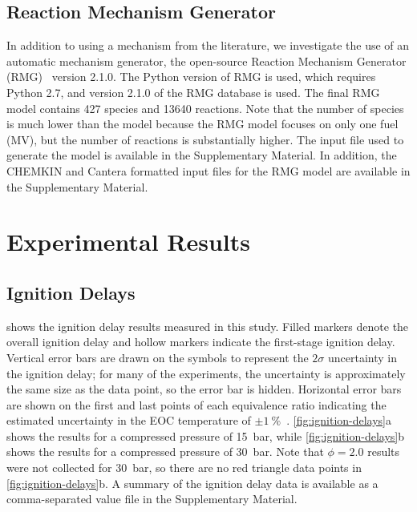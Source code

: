 \documentclass[letterpaper, review, sort&compress]{elsarticle}
\begin{document}
\subsection{Reaction Mechanism Generator}\label{sec:reaction-mechanism-generator}

In addition to using a mechanism from the literature, we investigate the use of an automatic
mechanism generator, the open-source Reaction Mechanism Generator (RMG)~\cite{Allen2012} version
2.1.0. The Python version of RMG is used, which requires Python 2.7, and version 2.1.0 of the RMG
database is used. The final RMG model contains 427 species and 13640 reactions. Note that the number
of species is much lower than the \citet{Dievart2013} model because the RMG model focuses on only
one fuel (MV), but the number of reactions is substantially higher. The input file used to generate
the model is available in the Supplementary Material. In addition, the CHEMKIN and Cantera formatted
input files for the RMG model are available in the Supplementary Material.

\section{Experimental Results}\label{sec:experimental-results}
\subsection{Ignition Delays}\label{sec:ignition-delays}

 shows the ignition delay results measured in this study. Filled markers
denote the overall ignition delay and hollow markers indicate the first-stage ignition delay.
Vertical error bars are drawn on the symbols to represent the \(2\sigma\) uncertainty in the
ignition delay; for many of the experiments, the uncertainty is approximately the same size as the
data point, so the error bar is hidden. Horizontal error bars are shown on the first and last points
of each equivalence ratio indicating the estimated uncertainty in the EOC temperature of
$\pm\SI{1}{\percent}$~\cite{Weber2015}. \cref{fig:ignition-delays}a shows the results for a
compressed pressure of \SI{15}{\bar}, while \cref{fig:ignition-delays}b shows the results for a
compressed pressure of \SI{30}{\bar}. Note that $\phi=2.0$ results were not collected for
\SI{30}{\bar}, so there are no red triangle data points in \cref{fig:ignition-delays}b. A summary of
the ignition delay data is available as a comma-separated value file in the Supplementary Material.
\end{document}
